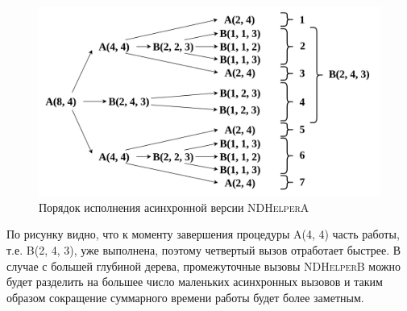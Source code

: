 \begin{figure}[h]
\centering
\includegraphics[width=\textwidth]{images/async_nda.png}
    \caption{Порядок исполнения асинхронной версии \textsc{NDHelperA}}
\end{figure}

По рисунку видно, что к моменту завершения процедуры \textsc{A(4, 4)} часть работы, т.е. \textsc{B(2, 4, 3)}, уже выполнена, поэтому четвертый вызов отработает быстрее.
В случае с большей глубиной дерева, промежуточные вызовы \textsc{NDHelperB} можно будет разделить на большее число маленьких асинхронных вызовов и таким образом сокращение суммарного времени работы будет более заметным.
